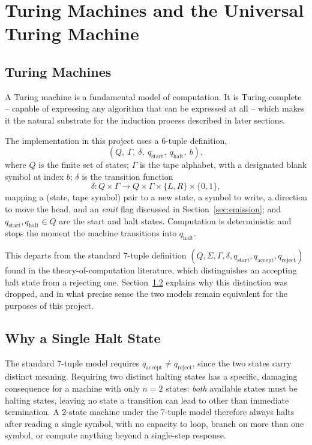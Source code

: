 \documentclass[11pt]{article}
\begin{document}
\section{Turing Machines and the Universal Turing Machine}
\label{sec:turing}

\subsection{Turing Machines}
\label{sec:tm}

A Turing machine is a fundamental model of computation. It is Turing-complete --
capable of expressing any algorithm that can be expressed at all -- which makes it the
natural substrate for the induction process described in later sections.

The implementation in this project uses a 6-tuple definition,
\[
  (Q,\ \Gamma,\ \delta,\ q_{\text{start}},\ q_{\text{halt}},\ b),
\]
where $Q$ is the finite set of states; $\Gamma$ is the tape alphabet, with a designated
blank symbol at index $b$; $\delta$ is the transition function
\[
  \delta : Q \times \Gamma \to Q \times \Gamma \times \{L, R\} \times \{0,1\},
\]
mapping a (state, tape symbol) pair to a new state, a symbol to write, a direction to move
the head, and an \emph{emit} flag discussed in Section~\ref{sec:emission}; and
$q_{\text{start}}, q_{\text{halt}} \in Q$ are the start and halt states. Computation is
deterministic and stops the moment the machine transitions into $q_{\text{halt}}$.

This departs from the standard 7-tuple definition
$(Q, \Sigma, \Gamma, \delta, q_{\text{start}}, q_{\text{accept}}, q_{\text{reject}})$ found
in the theory-of-computation literature, which distinguishes an accepting halt state from a
rejecting one. Section~\ref{sec:halt-merge} explains why this distinction was dropped, and
in what precise sense the two models remain equivalent for the purposes of this project.

\subsection{Why a Single Halt State}
\label{sec:halt-merge}

The standard 7-tuple model requires $q_{\text{accept}} \neq q_{\text{reject}}$, since the
two states carry distinct meaning. Requiring two distinct halting states has a specific,
damaging consequence for a machine with only $n=2$ states: \emph{both} available states
must be halting states, leaving no state a transition can lead to other than immediate
termination. A 2-state machine under the 7-tuple model therefore always halts after reading
a single symbol, with no capacity to loop, branch on more than one symbol, or compute
anything beyond a single-step response.
\end{document}
